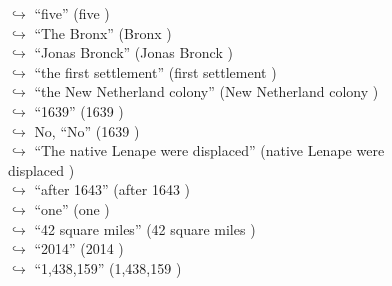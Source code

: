 \documentclass[11pt,a4paper, onecolumn]{article}
\begin{document}
\begin{figure}[t] \small \begin{tcolorbox}[boxsep=0pt,left=5pt,right=0pt,top=2pt,colback = yellow!5] \begin{dialogue}
 \small 
\colorbox{pink!25}{$\hookrightarrow$}
{ ``five'' (five ) }
\\
\colorbox{pink!25}{$\hookrightarrow$}
{ ``The Bronx'' (Bronx ) }
\\
\colorbox{pink!25}{$\hookrightarrow$}
{ ``Jonas Bronck'' (Jonas Bronck ) }
\\
\colorbox{pink!25}{$\hookrightarrow$}
{ ``the first settlement'' (first settlement ) }
\\
\colorbox{pink!25}{$\hookrightarrow$}
{ ``the New Netherland colony'' (New Netherland colony ) }
\\
\colorbox{pink!25}{$\hookrightarrow$}
{ ``1639'' (1639 ) }
\\
\colorbox{pink!25}{$\hookrightarrow$}
\colorbox{red!25}{No,}
{ ``No'' (1639 ) }
\\
\colorbox{pink!25}{$\hookrightarrow$}
{ ``The native Lenape were displaced'' (native Lenape were displaced ) }
\\
\colorbox{pink!25}{$\hookrightarrow$}
{ ``after 1643'' (after 1643 ) }
\\
\colorbox{pink!25}{$\hookrightarrow$}
{ ``one'' (one ) }
\\
\colorbox{pink!25}{$\hookrightarrow$}
{ ``42 square miles'' (42 square miles ) }
\\
\colorbox{pink!25}{$\hookrightarrow$}
{ ``2014'' (2014 ) }
\\
\colorbox{pink!25}{$\hookrightarrow$}
{ ``1,438,159'' (1,438,159 ) }
\\

\end{dialogue}
\end{tcolorbox}
\end{figure}
\end{document}
